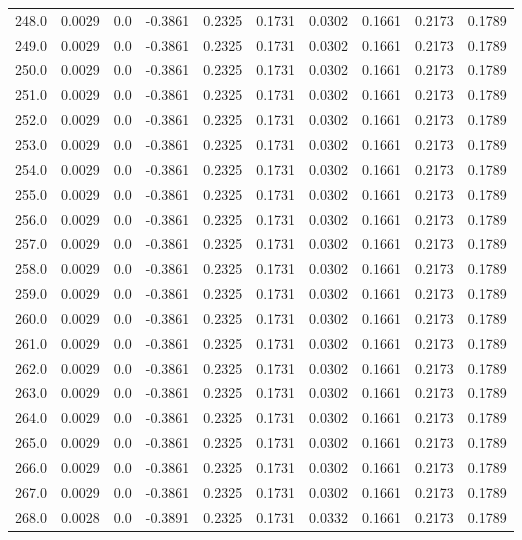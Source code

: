 \begin{longtable}{lrrrrrrrrr}
248.0 & 0.0029 & 0.0 & -0.3861 & 0.2325 & 0.1731 & 0.0302 & 0.1661 & 0.2173 & 0.1789 \\
249.0 & 0.0029 & 0.0 & -0.3861 & 0.2325 & 0.1731 & 0.0302 & 0.1661 & 0.2173 & 0.1789 \\
250.0 & 0.0029 & 0.0 & -0.3861 & 0.2325 & 0.1731 & 0.0302 & 0.1661 & 0.2173 & 0.1789 \\
251.0 & 0.0029 & 0.0 & -0.3861 & 0.2325 & 0.1731 & 0.0302 & 0.1661 & 0.2173 & 0.1789 \\
252.0 & 0.0029 & 0.0 & -0.3861 & 0.2325 & 0.1731 & 0.0302 & 0.1661 & 0.2173 & 0.1789 \\
253.0 & 0.0029 & 0.0 & -0.3861 & 0.2325 & 0.1731 & 0.0302 & 0.1661 & 0.2173 & 0.1789 \\
254.0 & 0.0029 & 0.0 & -0.3861 & 0.2325 & 0.1731 & 0.0302 & 0.1661 & 0.2173 & 0.1789 \\
255.0 & 0.0029 & 0.0 & -0.3861 & 0.2325 & 0.1731 & 0.0302 & 0.1661 & 0.2173 & 0.1789 \\
256.0 & 0.0029 & 0.0 & -0.3861 & 0.2325 & 0.1731 & 0.0302 & 0.1661 & 0.2173 & 0.1789 \\
257.0 & 0.0029 & 0.0 & -0.3861 & 0.2325 & 0.1731 & 0.0302 & 0.1661 & 0.2173 & 0.1789 \\
258.0 & 0.0029 & 0.0 & -0.3861 & 0.2325 & 0.1731 & 0.0302 & 0.1661 & 0.2173 & 0.1789 \\
259.0 & 0.0029 & 0.0 & -0.3861 & 0.2325 & 0.1731 & 0.0302 & 0.1661 & 0.2173 & 0.1789 \\
260.0 & 0.0029 & 0.0 & -0.3861 & 0.2325 & 0.1731 & 0.0302 & 0.1661 & 0.2173 & 0.1789 \\
261.0 & 0.0029 & 0.0 & -0.3861 & 0.2325 & 0.1731 & 0.0302 & 0.1661 & 0.2173 & 0.1789 \\
262.0 & 0.0029 & 0.0 & -0.3861 & 0.2325 & 0.1731 & 0.0302 & 0.1661 & 0.2173 & 0.1789 \\
263.0 & 0.0029 & 0.0 & -0.3861 & 0.2325 & 0.1731 & 0.0302 & 0.1661 & 0.2173 & 0.1789 \\
264.0 & 0.0029 & 0.0 & -0.3861 & 0.2325 & 0.1731 & 0.0302 & 0.1661 & 0.2173 & 0.1789 \\
265.0 & 0.0029 & 0.0 & -0.3861 & 0.2325 & 0.1731 & 0.0302 & 0.1661 & 0.2173 & 0.1789 \\
266.0 & 0.0029 & 0.0 & -0.3861 & 0.2325 & 0.1731 & 0.0302 & 0.1661 & 0.2173 & 0.1789 \\
267.0 & 0.0029 & 0.0 & -0.3861 & 0.2325 & 0.1731 & 0.0302 & 0.1661 & 0.2173 & 0.1789 \\
268.0 & 0.0028 & 0.0 & -0.3891 & 0.2325 & 0.1731 & 0.0332 & 0.1661 & 0.2173 & 0.1789 \\

\end{longtable}
